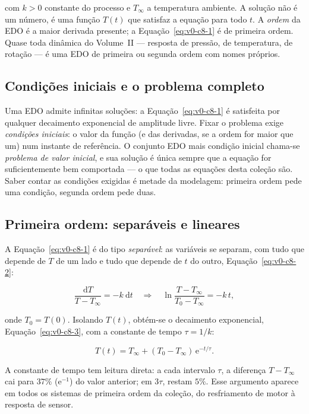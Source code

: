 \documentclass[12pt,a4paper]{article}
\numberwithin{equation}{section}
\numberwithin{table}{section}
\numberwithin{figure}{section}
\begin{document}
com $k > 0$ constante do processo e $T_{\infty}$ a temperatura ambiente.
A solução não é um número, é uma função $T(t)$ que satisfaz a equação para
todo $t$. A \emph{ordem} da EDO é a maior derivada presente; a
Equação~\eqref{eq:v0-c8-1} é de primeira ordem. Quase toda dinâmica do
Volume~II --- resposta de pressão, de temperatura, de rotação --- é uma
EDO de primeira ou segunda ordem com nomes próprios.

\subsection{Condições iniciais e o problema completo}

Uma EDO admite infinitas soluções: a Equação~\eqref{eq:v0-c8-1} é satisfeita
por qualquer decaimento exponencial de amplitude livre. Fixar o problema
exige \emph{condições iniciais}: o valor da função (e das derivadas, se a
ordem for maior que um) num instante de referência. O conjunto EDO mais
condição inicial chama-se \emph{problema de valor inicial}, e sua solução
é única sempre que a equação for suficientemente bem comportada --- o que
todas as equações desta coleção são. Saber contar as condições exigidas é
metade da modelagem: primeira ordem pede uma condição, segunda ordem pede
duas.

\subsection{Primeira ordem: separáveis e lineares}

A Equação~\eqref{eq:v0-c8-1} é do tipo \emph{separável}: as variáveis se
separam, com tudo que depende de $T$ de um lado e tudo que depende de $t$
do outro, Equação~\eqref{eq:v0-c8-2}:

\begin{equation}\label{eq:v0-c8-2}
\frac{\mathrm{d}T}{T - T_{\infty}} = -k\ \mathrm{d}t
\quad\Longrightarrow\quad
\ln\frac{T - T_{\infty}}{T_0 - T_{\infty}} = -k\,t,
\end{equation}

onde $T_0 = T(0)$. Isolando $T(t)$, obtém-se o decaimento exponencial,
Equação~\eqref{eq:v0-c8-3}, com a constante de tempo $\tau = 1/k$:

\begin{equation}\label{eq:v0-c8-3}
T(t) = T_{\infty} + (T_0 - T_{\infty})\,\mathrm{e}^{-t/\tau}.
\end{equation}

A constante de tempo tem leitura direta: a cada intervalo $\tau$, a
diferença $T - T_{\infty}$ cai para $37\%$ ($\mathrm{e}^{-1}$) do valor
anterior; em $3\tau$, restam $5\%$. Esse argumento aparece em todos os
sistemas de primeira ordem da coleção, do resfriamento de motor à
resposta de sensor.
\end{document}
